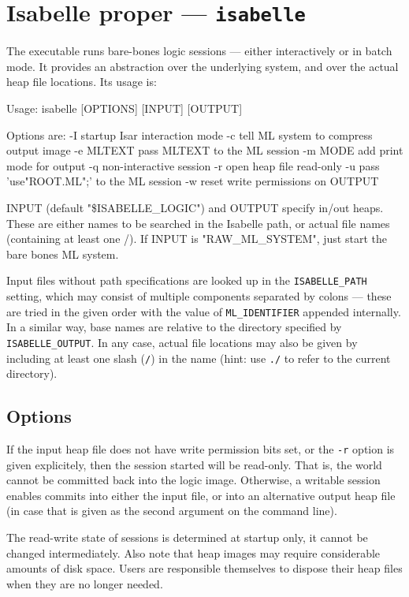 \section{Isabelle proper --- \texttt{isabelle}}

The  executable runs bare-bones logic sessions --- either
interactively or in batch mode. It provides an abstraction over the underlying
{\ML} system, and over the actual heap file locations. Its usage is:
\begin{ttbox}
Usage: isabelle [OPTIONS] [INPUT] [OUTPUT]

  Options are:
    -I           startup Isar interaction mode
    -c           tell ML system to compress output image
    -e MLTEXT    pass MLTEXT to the ML session
    -m MODE      add print mode for output
    -q           non-interactive session
    -r           open heap file read-only
    -u           pass 'use"ROOT.ML";' to the ML session
    -w           reset write permissions on OUTPUT

  INPUT (default "\$ISABELLE_LOGIC") and OUTPUT specify in/out heaps.
  These are either names to be searched in the Isabelle path, or
  actual file names (containing at least one /).
  If INPUT is "RAW_ML_SYSTEM", just start the bare bones ML system.
\end{ttbox}
Input files without path specifications are looked up in the
\texttt{ISABELLE_PATH} setting, which may consist of multiple components
separated by colons --- these are tried in the given order with the value of
\texttt{ML_IDENTIFIER} appended internally.  In a similar way, base names are
relative to the directory specified by \texttt{ISABELLE_OUTPUT}.  In any case,
actual file locations may also be given by including at least one slash
(\texttt{/}) in the name (hint: use \texttt{./} to refer to the current
directory).


\subsection*{Options}

If the input heap file does not have write permission bits set, or the
\texttt{-r} option is given explicitely, then the session started will be
read-only.  That is, the {\ML} world cannot be committed back into the logic
image.  Otherwise, a writable session enables commits into either the input
file, or into an alternative output heap file (in case that is given as the
second argument on the command line).

The read-write state of sessions is determined at startup only, it cannot be
changed intermediately. Also note that heap images may require considerable
amounts of disk space. Users are responsible themselves to dispose their heap
files when they are no longer needed.

